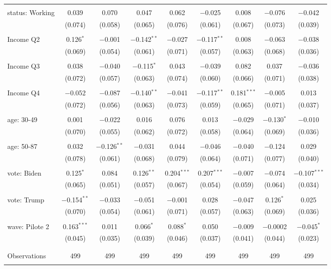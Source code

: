 \begin{tabular}{@{\extracolsep{5pt}}lcccccccc}
  & & & & & & & & \\ 
 status: Working & 0.039 & 0.070 & 0.047 & 0.062 & $-$0.025 & 0.008 & $-$0.076 & $-$0.042 \\ 
  & (0.074) & (0.058) & (0.065) & (0.076) & (0.061) & (0.067) & (0.073) & (0.039) \\ 
  & & & & & & & & \\ 
 Income Q2 & 0.126$^{*}$ & $-$0.001 & $-$0.142$^{**}$ & $-$0.027 & $-$0.117$^{**}$ & 0.008 & $-$0.063 & $-$0.038 \\ 
  & (0.069) & (0.054) & (0.061) & (0.071) & (0.057) & (0.063) & (0.068) & (0.036) \\ 
  & & & & & & & & \\ 
 Income Q3 & 0.038 & $-$0.040 & $-$0.115$^{*}$ & 0.043 & $-$0.039 & 0.082 & 0.037 & $-$0.036 \\ 
  & (0.072) & (0.057) & (0.063) & (0.074) & (0.060) & (0.066) & (0.071) & (0.038) \\ 
  & & & & & & & & \\ 
 Income Q4 & $-$0.052 & $-$0.087 & $-$0.140$^{**}$ & $-$0.041 & $-$0.117$^{**}$ & 0.181$^{***}$ & $-$0.005 & 0.013 \\ 
  & (0.072) & (0.056) & (0.063) & (0.073) & (0.059) & (0.065) & (0.071) & (0.037) \\ 
  & & & & & & & & \\ 
 age: 30-49 & 0.001 & $-$0.022 & 0.016 & 0.076 & 0.013 & $-$0.029 & $-$0.130$^{*}$ & $-$0.010 \\ 
  & (0.070) & (0.055) & (0.062) & (0.072) & (0.058) & (0.064) & (0.069) & (0.036) \\ 
  & & & & & & & & \\ 
 age: 50-87 & 0.032 & $-$0.126$^{**}$ & $-$0.031 & 0.044 & $-$0.046 & $-$0.040 & $-$0.124 & 0.029 \\ 
  & (0.078) & (0.061) & (0.068) & (0.079) & (0.064) & (0.071) & (0.077) & (0.040) \\ 
  & & & & & & & & \\ 
 vote: Biden & 0.125$^{*}$ & 0.084 & 0.126$^{**}$ & 0.204$^{***}$ & 0.207$^{***}$ & $-$0.007 & $-$0.074 & $-$0.107$^{***}$ \\ 
  & (0.065) & (0.051) & (0.057) & (0.067) & (0.054) & (0.059) & (0.064) & (0.034) \\ 
  & & & & & & & & \\ 
 vote: Trump & $-$0.154$^{**}$ & $-$0.033 & $-$0.051 & $-$0.001 & 0.028 & $-$0.047 & 0.126$^{*}$ & 0.025 \\ 
  & (0.070) & (0.054) & (0.061) & (0.071) & (0.057) & (0.063) & (0.069) & (0.036) \\ 
  & & & & & & & & \\ 
 wave: Pilote 2 & 0.163$^{***}$ & 0.011 & 0.066$^{*}$ & 0.088$^{*}$ & 0.050 & $-$0.009 & $-$0.0002 & $-$0.045$^{*}$ \\ 
  & (0.045) & (0.035) & (0.039) & (0.046) & (0.037) & (0.041) & (0.044) & (0.023) \\ 
  & & & & & & & & \\ 
\hline \\[-1.8ex] 

Observations & 499 & 499 & 499 & 499 & 499 & 499 & 499 & 499 \\ 
\hline 
\hline \\[-1.8ex] 
\end{tabular} 